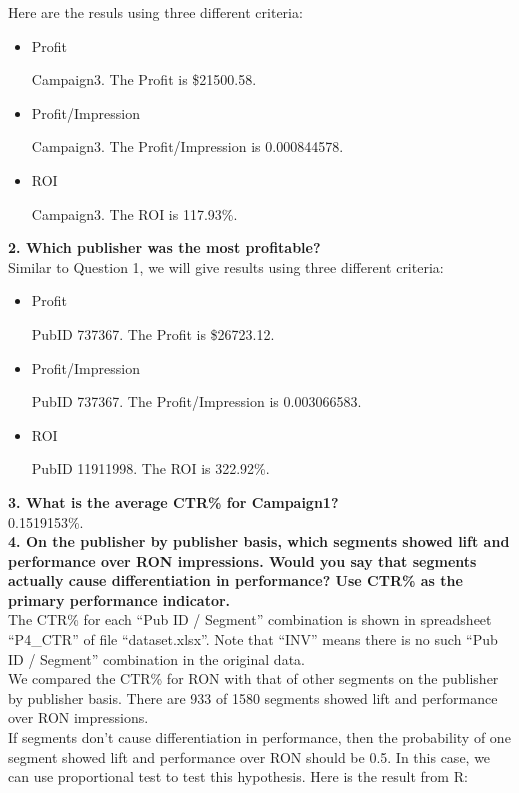 \documentclass[12pt]{article}
\begin{document}
Here are the resuls using three different criteria:

\begin{itemize}
\item Profit

	Campaign3. The Profit is \$21500.58.
\item Profit/Impression

	Campaign3. The Profit/Impression is 0.000844578.
\item ROI

	Campaign3. The ROI is 117.93\%.
\end{itemize} 

{\bf 2. Which publisher was the most profitable?} \\

Similar to Question 1, we will give results using three different criteria:

\begin{itemize}
\item Profit

	PubID 737367. The Profit is \$26723.12.
\item Profit/Impression

	PubID 737367. The Profit/Impression is 0.003066583.
\item ROI

	PubID 11911998. The ROI is 322.92\%.
\end{itemize} 

{\bf 3. What is the average CTR\% for Campaign1?} \\

0.1519153\%. \\

{\bf 4. On the publisher by publisher basis, which segments showed lift and performance over RON impressions. Would you say that segments actually cause differentiation in performance? Use CTR\% as the primary performance indicator.} \\

The CTR\% for each ``Pub ID / Segment'' combination is shown in spreadsheet ``P4\_CTR'' of file ``dataset.xlsx''. Note that ``INV'' means there is no such ``Pub ID / Segment'' combination in the original data. \\

We compared the CTR\% for RON with that of other segments on the publisher by publisher basis. There are 933 of 1580 segments showed lift and performance over RON impressions. \\

If segments don't cause differentiation in performance, then the probability of one segment showed lift and performance over RON should be 0.5. In this case, we can use proportional test to test this hypothesis. Here is the result from R:
\end{document}

